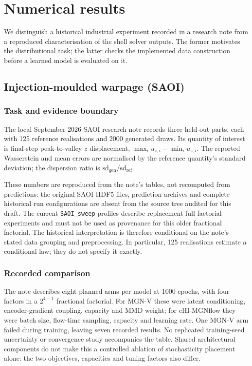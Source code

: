\section{Numerical results}
\label{sec:results}

We distinguish a historical industrial experiment recorded in a research note
from a reproduced characterisation of the shell solver outputs. The former
motivates the distributional task; the latter checks the implemented data
construction before a learned model is evaluated on it.

\subsection{Injection-moulded warpage (SAOI)}
\label{sec:results:saoi}

\subsubsection{Task and evidence boundary}
The local September 2026 SAOI research note records three held-out parts, each
with 125 reference realisations and 2000 generated draws. Its quantity of
interest is final-step peak-to-valley $z$ displacement,
$\max_i u_{z,i}-\min_i u_{z,i}$. The reported Wasserstein and mean errors are
normalised by the reference quantity's standard deviation; the dispersion
ratio is $\mathrm{sd}_{\mathrm{gen}}/\mathrm{sd}_{\mathrm{ref}}$.

These numbers are reproduced from the note's tables, not recomputed from
predictions: the original SAOI HDF5 files, prediction archives and complete
historical run configurations are absent from the source tree audited for this
draft. The current \texttt{SAOI\_sweep} profiles describe replacement full
factorial experiments and must not be used as provenance for this older
fractional factorial. The historical interpretation is therefore conditional
on the note's stated data grouping and preprocessing. In particular, 125
realisations estimate a conditional law; they do not specify it exactly.

\subsubsection{Recorded comparison}
The note describes eight planned arms per model at 1000 epochs, with four
factors in a $2^{4-1}$ fractional factorial. For MGN-V these were latent
conditioning, encoder-gradient coupling, capacity and MMD weight; for
cHI-MGNflow they were batch size, flow-time sampling, capacity and learning
rate. One MGN-V arm failed during training, leaving seven recorded results.
No replicated training-seed uncertainty or convergence study accompanies the
table. Shared architectural components do not make this a controlled ablation
of stochasticity placement alone: the two objectives, capacities and tuning
factors also differ.

